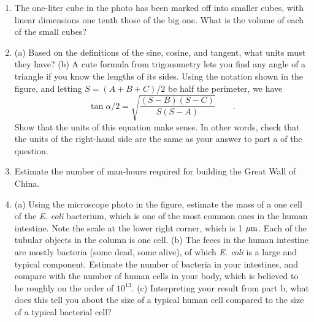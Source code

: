 \begin{enumerate}
\label{triangle-formula}




\item
The one-liter cube in the photo has been marked off into smaller
cubes, with linear dimensions one tenth those of the big one.
What is the volume of each of the small cubes?







\vspace{1.5mm}

\item  
(a) Based on the definitions of the sine, cosine, and tangent, what units
must they have?
(b) A cute formula from trigonometry lets you find any angle of
a triangle if you know the lengths of its sides. Using the
notation shown in the figure, and letting $S=(A+B+C)/2$ be half the
perimeter, we have 
\begin{equation*}
 \tan \alpha/2=\sqrt{\frac{(S-B)(S-C)}{S(S-A)}} \qquad .
\end{equation*}
Show that the units of this equation make sense. In other words, check that the
units of the right-hand side are the same as your answer to part a of the question.

\item
Estimate the number of man-hours required for building the Great Wall of China. 

\item 
(a) Using the microscope photo in the figure, estimate the mass of a one cell of the
\emph{E. coli} bacterium, which is one of the most common ones in the human
intestine. Note the scale at the lower right corner, which is 1 $\mu\textup{m}$. Each of
the tubular objects in the column is one cell.
(b) The feces in the human intestine are mostly bacteria (some dead, some alive),
of which \emph{E. coli} is a large and typical component. Estimate the number of bacteria
in your intestines, and compare with the number of human cells in your body, which is
believed to be roughly on the order of $10^{13}$. (c) Interpreting your result from part b,
what does this tell you about the size of a typical human cell compared to the size of
a typical bacterial cell?



\end{enumerate}
